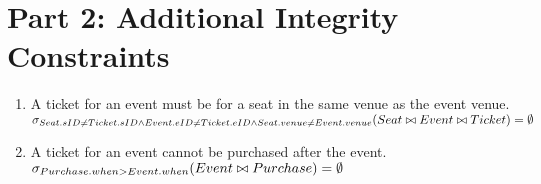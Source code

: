 \documentclass{article}
\begin{document}
\section*{Part 2: Additional Integrity Constraints}

\begin{enumerate}
\item   %
A ticket for an event must be for a seat in the same venue as the event venue. \\[5pt]
{ \large
$
	\sigma_{
		Seat.sID \neq Ticket.sID \wedge
		Event.eID \neq Ticket.eID \wedge
		Seat.venue \neq Event.venue
		}
	(Seat \bowtie Event \bowtie Ticket) = \emptyset \\[10pt]
$
}
\item   %
A ticket for an event cannot be purchased after the event. \\[5pt]
{ \large
$
	\sigma_{
		Purchase.when > Event.when
		}
	(Event \bowtie Purchase) = \emptyset \\[10pt]
$
}

\end{enumerate}
\end{document}
